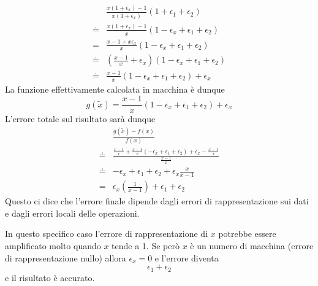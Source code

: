 \begin{example}
	\begin{align*}
		       & \frac{x (1 + \epsilon_x) - 1}{x (1 + \epsilon_x)} (1 + \epsilon_1 + \epsilon_2)        \\
		\doteq & \frac{x (1 + \epsilon_x) - 1}{x} (1 - \epsilon_x + \epsilon_1 + \epsilon_2)            \\
		=      & \frac{x - 1 + x \epsilon_x}{x} (1 - \epsilon_x + \epsilon_1 + \epsilon_2)              \\
		\doteq & \left( \frac{x - 1}{x} + \epsilon_x \right) (1 - \epsilon_x + \epsilon_1 + \epsilon_2) \\
		\doteq & \frac{x - 1}{x} (1 - \epsilon_x + \epsilon_1 + \epsilon_2) + \epsilon_x
	\end{align*}
	La funzione effettivamente calcolata in macchina è dunque
	\[ g(\tilde{x}) = \frac{x - 1}{x} (1 - \epsilon_x + \epsilon_1 + \epsilon_2) + \epsilon_x \]
	L'errore totale sul risultato sarà dunque
	\begin{align*}
		       & \frac{g(\tilde{x}) - f(x)}{f(x)}                                                            \\
		\doteq & \frac{\frac{x - 1}{x} + \frac{x-1}{x}(-\epsilon_x + \epsilon_1 + \epsilon_2) + \epsilon_x -
		\frac{x - 1}{x}}{\frac{x-1}{x}}                                                                      \\
		\doteq & -\epsilon_x + \epsilon_1 + \epsilon_2 + \epsilon_x \frac{x}{x - 1}                          \\
		=      & \epsilon_x \left( \frac{1}{x - 1} \right) + \epsilon_1 + \epsilon_2
	\end{align*}
	Questo ci dice che l'errore finale dipende dagli errori di rappresentazione sui dati e dagli errori locali
	delle operazioni.

	In questo specifico caso l'errore di rappresentazione di $x$ potrebbe essere amplificato molto quando $x$
	tende a 1. Se però $x$ è un numero di macchina (errore di rappresentazione nullo) allora $\epsilon_x = 0$
	e l'errore diventa
	\[ \epsilon_1 + \epsilon_2 \]
	e il risultato è accurato.
\end{example}
